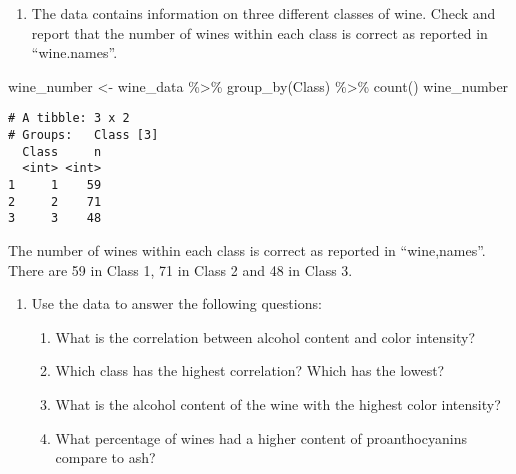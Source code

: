 \documentclass[
  letterpaper,
  DIV=11,
  numbers=noendperiod]{scrartcl}
\newenvironment{Shaded}{\begin{snugshade}}{\end{snugshade}}
\newcommand{\AttributeTok}[1]{\textcolor[rgb]{0.40,0.45,0.13}{#1}}
\newcommand{\FunctionTok}[1]{\textcolor[rgb]{0.28,0.35,0.67}{#1}}
\newcommand{\NormalTok}[1]{\textcolor[rgb]{0.00,0.23,0.31}{#1}}
\newcommand{\OtherTok}[1]{\textcolor[rgb]{0.00,0.23,0.31}{#1}}
\newcommand{\SpecialCharTok}[1]{\textcolor[rgb]{0.37,0.37,0.37}{#1}}
\newcommand{\StringTok}[1]{\textcolor[rgb]{0.13,0.47,0.30}{#1}}
\providecommand{\tightlist}{%
  \setlength{\itemsep}{0pt}\setlength{\parskip}{0pt}}\usepackage{longtable,booktabs,array}
\begin{document}
\begin{enumerate}
\def\labelenumi{\alph{enumi}.}
\setcounter{enumi}{1}
\tightlist
\item
  The data contains information on three different classes of wine.
  Check and report that the number of wines within each class is correct
  as reported in ``wine.names''.
\end{enumerate}

\begin{Shaded}
\begin{Highlighting}[]
\NormalTok{wine\_number }\OtherTok{\textless{}{-}}\NormalTok{ wine\_data }\SpecialCharTok{\%\textgreater{}\%} \FunctionTok{group\_by}\NormalTok{(Class) }\SpecialCharTok{\%\textgreater{}\%} \FunctionTok{count}\NormalTok{()}
\NormalTok{wine\_number}
\end{Highlighting}
\end{Shaded}

\begin{verbatim}
# A tibble: 3 x 2
# Groups:   Class [3]
  Class     n
  <int> <int>
1     1    59
2     2    71
3     3    48
\end{verbatim}

The number of wines within each class is correct as reported in
``wine,names''. There are 59 in Class 1, 71 in Class 2 and 48 in Class
3.

\begin{enumerate}
\def\labelenumi{\alph{enumi}.}
\setcounter{enumi}{2}
\item
  Use the data to answer the following questions:

  \begin{enumerate}
  \def\labelenumii{\arabic{enumii}.}
  \item
    What is the correlation between alcohol content and color intensity?
  \item
    Which class has the highest correlation? Which has the lowest?
  \item
    What is the alcohol content of the wine with the highest color
    intensity?
  \item
    What percentage of wines had a higher content of proanthocyanins
    compare to ash?
  \end{enumerate}
\end{enumerate}

\begin{Shaded}
\end{Shaded}
\end{document}
